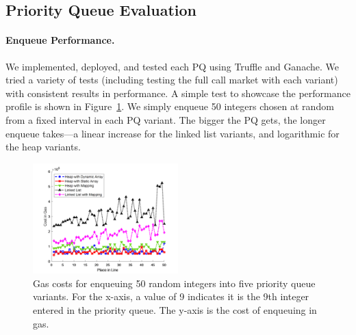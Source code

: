 
\subsection{Priority Queue Evaluation} 

\paragraph{Enqueue Performance.} We implemented, deployed, and tested each PQ using Truffle and Ganache. We tried a variety of tests (including testing the full call market with each variant) with consistent results in performance. A simple test to showcase the performance profile is shown in Figure~\ref{fig:random_insertion}. We simply enqueue 50 integers chosen at random from a fixed interval in each PQ variant. The bigger the PQ gets, the longer enqueue takes---a linear increase for the linked list variants, and logarithmic for the heap variants. 



\begin{figure}[t]
\centering
\includegraphics[width=0.5\textwidth]{fig/random_insertion3.png}
\caption{Gas costs for enqueuing 50 random integers into five priority queue variants. For the x-axis, a value of 9 indicates it is the 9th integer entered in the priority queue. The y-axis is the cost of enqueuing in gas.  \label{fig:random_insertion}}
\end{figure}






